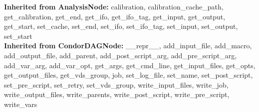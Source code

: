   \textbf{Inherited from AnalysisNode:}
    calibration,
    calibration\_cache\_path,
    get\_calibration,
    get\_end,
    get\_ifo,
    get\_ifo\_tag,
    get\_input,
    get\_output,
    get\_start,
    set\_cache,
    set\_end,
    set\_ifo,
    set\_ifo\_tag,
    set\_input,
    set\_output,
    set\_start
    \\
  \textbf{Inherited from CondorDAGNode:}
    \_\_repr\_\_,
    add\_input\_file,
    add\_macro,
    add\_output\_file,
    add\_parent,
    add\_post\_script\_arg,
    add\_pre\_script\_arg,
    add\_var\_arg,
    add\_var\_opt,
    get\_args,
    get\_cmd\_line,
    get\_input\_files,
    get\_opts,
    get\_output\_files,
    get\_vds\_group,
    job,
    set\_log\_file,
    set\_name,
    set\_post\_script,
    set\_pre\_script,
    set\_retry,
    set\_vds\_group,
    write\_input\_files,
    write\_job,
    write\_output\_files,
    write\_parents,
    write\_post\_script,
    write\_pre\_script,
    write\_vars
